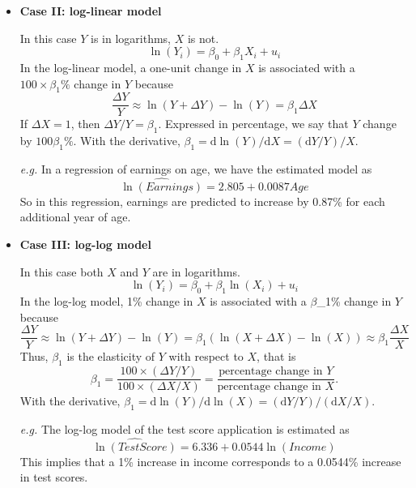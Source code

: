 \documentclass[a4paper,11pt]{article}
\newcommand{\dx}{\mathrm{d}}
\begin{document}
\begin{itemize}
\item \textbf{Case II: log-linear model}
\label{sec:org3ad0a4f}

In this case \(Y\) is in logarithms, \(X\)
is not.
\begin{equation}
\label{eq:log-linear}
\ln(Y_i) = \beta_0 + \beta_1 X_i + u_i
\end{equation}
In the log-linear model, a one-unit change in \(X\) is associated
with a \(100 \times \beta_1\%\) change in \(Y\) because
\begin{equation*}
\frac{\Delta Y}{Y} \approx \ln(Y + \Delta Y) - \ln(Y) = \beta_1 \Delta X
\end{equation*}
If \(\Delta X = 1\), then \(\Delta Y / Y = \beta_1\). Expressed in
percentage, we say that \(Y\) change by \(100\beta_1\%\). With the
derivative, \(\beta_1 = \dx \ln(Y) / \dx X = (\dx Y/Y) / X\).

\emph{e.g.} In a regression of earnings on age, we have the estimated
model as
\[ \widehat{\ln(Earnings)} = 2.805 + 0.0087Age \]
So in this regression, earnings are predicted to increase by
0.87\% for each additional year of age.

\item \textbf{Case III: log-log model}
\label{sec:org0e11cec}

In this case both \(X\) and \(Y\) are in
logarithms.
\begin{equation}
\label{eq:log-log}
\ln(Y_i) = \beta_0 + \beta_1 \ln(X_i) + u_i
\end{equation}
In the log-log model, 1\% change in \(X\) is associated with a
\(\beta\)\_1\% change in \(Y\) because
\[ \frac{\Delta Y}{Y} \approx \ln(Y + \Delta Y) - \ln(Y) =
\beta_1 (\ln(X + \Delta X) - \ln(X)) \approx \beta_1 \frac{\Delta
X}{X} \]
Thus, \(\beta_{\text{1}}\) is the elasticity of \(Y\) with respect to \(X\), that
is
\[ \beta_1 = \frac{100 \times (\Delta Y / Y)}{100\times (\Delta X
/ X)} =\frac{\text{percentage change in } Y}{\text{percentage
change in } X}.\]
With the derivative, \(\beta_1 = \dx \ln(Y) / \dx \ln(X) = (\dx Y/Y) /
(\dx X/X)\).

\emph{e.g.} The log-log model of the test score application is
estimated as
\[ \widehat{\ln(TestScore)} = 6.336 + 0.0544 \ln(Income) \]
This implies that a 1\% increase in income corresponds to a
0.0544\% increase in test scores.


\end{itemize}
\end{document}
